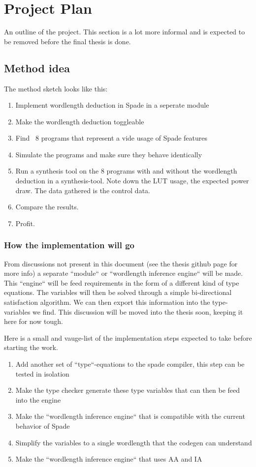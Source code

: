 \documentclass[msc,lith,english]{liuthesis}
\begin{document}
\chapter{Project Plan}
An outline of the project. This section is a lot more informal and is expected to be removed before the final thesis is done.

\section{Method idea}
The method sketch looks like this:
\begin{enumerate}
  \item Implement wordlength deduction in Spade in a seperate module
  \item Make the wordlength deduction toggleable
  \item Find ~8 programs that represent a vide usage of Spade features
  \item Simulate the programs and make sure they behave identically
  \item Run a synthesis tool on the 8 programs with and without the wordlength deduction in a synthesis-tool. Note down the LUT usage, the expected power draw. The data gathered is the control data.
  \item Compare the results.
  \item Profit.
\end{enumerate}

\subsection{How the implementation will go}
From discussions not present in this document (see the thesis github page for more info) a separate ``module`` or ``wordlength inference engine`` will be made. This ``engine`` will be feed requirements in the form of a different kind of type equations. The variables will then be solved through a simple bi-directional satisfaction algorithm. We can then export this information into the type-variables we find. This discussion will be moved into the thesis soon, keeping it here for now tough. 

Here is a small and vauge-list of the implementation steps expected to take before starting the work.

\begin{enumerate}
    \item Add another set of ``type``-equations to the spade compiler, this step can be tested in isolation
    \item Make the type checker generate these type variables that can then be feed into the engine
    \item Make the ``wordlength inference engine`` that is compatible with the current behavior of Spade
    \item Simplify the variables to a single wordlength that the codegen can understand
    \item Make the ``wordlength inference engine`` that uses AA and IA
\end{enumerate}
\end{document}
